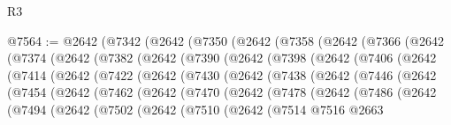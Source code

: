 \begin{lexlean}{R3}
\begin{coremodule}
@7564 := @2642
    (@7342
      (@2642
        (@7350
          (@2642
            (@7358
              (@2642
                (@7366
                  (@2642
                    (@7374
                      (@2642
                        (@7382
                          (@2642
                            (@7390
                              (@2642
                                (@7398
                                  (@2642
                                    (@7406
                                      (@2642
                                        (@7414
                                          (@2642
                                            (@7422
                                              (@2642
                                                (@7430
                                                  (@2642
                                                    (@7438
                                                      (@2642
                                                        (@7446
                                                          (@2642
                                                            (@7454
                                                              (@2642
                                                                (@7462
                                                                  (@2642
                                                                    (@7470
                                                                      (@2642
                                                                        (@7478
                                                                          (@2642
                                                                            (@7486
                                                                              (@2642
                                                                                (@7494
                                                                                  (@2642
                                                                                    (@7502
                                                                                      (@2642
                                                                                        (@7510
                                                                                          (@2642
                                                                                            (@7514
                                                                                              @7516
                                                                                              @2663

\end{coremodule}
\end{lexlean}
